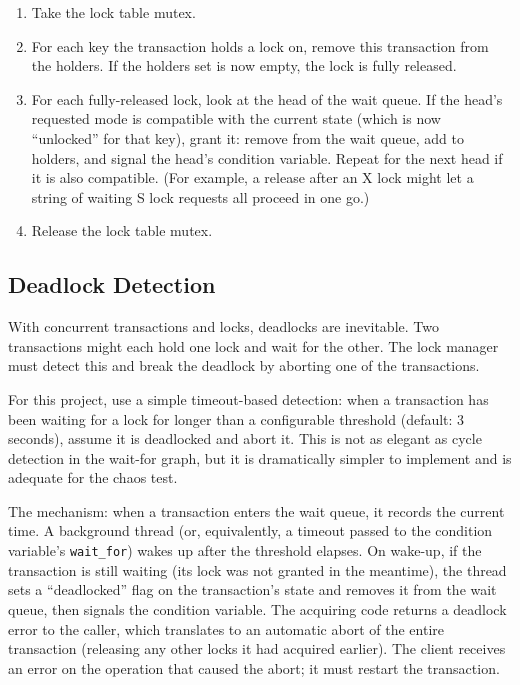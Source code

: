 \documentclass[11pt,a4paper]{article}
\begin{document}
\begin{enumerate}
\item Take the lock table mutex.
\item For each key the transaction holds a lock on, remove this transaction from the holders. If the holders set is now empty, the lock is fully released.
\item For each fully-released lock, look at the head of the wait queue. If the head's requested mode is compatible with the current state (which is now ``unlocked'' for that key), grant it: remove from the wait queue, add to holders, and signal the head's condition variable. Repeat for the next head if it is also compatible. (For example, a release after an X lock might let a string of waiting S lock requests all proceed in one go.)
\item Release the lock table mutex.
\end{enumerate}

\subsection{Deadlock Detection}
With concurrent transactions and locks, deadlocks are inevitable. Two transactions might each hold one lock and wait for the other. The lock manager must detect this and break the deadlock by aborting one of the transactions.

For this project, use a simple timeout-based detection: when a transaction has been waiting for a lock for longer than a configurable threshold (default: 3 seconds), assume it is deadlocked and abort it. This is not as elegant as cycle detection in the wait-for graph, but it is dramatically simpler to implement and is adequate for the chaos test.

The mechanism: when a transaction enters the wait queue, it records the current time. A background thread (or, equivalently, a timeout passed to the condition variable's \texttt{wait\_for}) wakes up after the threshold elapses. On wake-up, if the transaction is still waiting (its lock was not granted in the meantime), the thread sets a ``deadlocked'' flag on the transaction's state and removes it from the wait queue, then signals the condition variable. The acquiring code returns a deadlock error to the caller, which translates to an automatic abort of the entire transaction (releasing any other locks it had acquired earlier). The client receives an error on the operation that caused the abort; it must restart the transaction.
\end{document}
